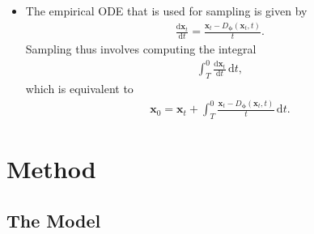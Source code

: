 \documentclass[10pt]{article}
\newcommand{\dee}{\mathrm{d}}
\newcommand{\ve}[1]{\mathbf{#1}}
\newcommand{\ves}[1]{\boldsymbol{#1}}
\begin{document}
\begin{itemize}
  \item The empirical ODE that is used for sampling is given by
  \begin{align*}
    \frac{\dee \ve{x}_t}{\dee t} = \frac{\ve{x}_t - D_{\ves{\phi}}(\ve{x}_t, t)}{t}.
  \end{align*}
  Sampling thus involves computing the integral
  \begin{align*}
    \int_{T}^0 \frac{\dee \ve{x}_t}{\dee t}\, \dee t,
  \end{align*}
  which is equivalent to
  \begin{align*}
    \ve{x}_0 = \ve{x}_t + \int_T^0 \frac{\ve{x}_t - D_{\ves{\phi}}(\ve{x}_t,t)}{t}\, \dee t.
  \end{align*}
\end{itemize}

\section{Method}

\subsection{The Model}
\end{document}

